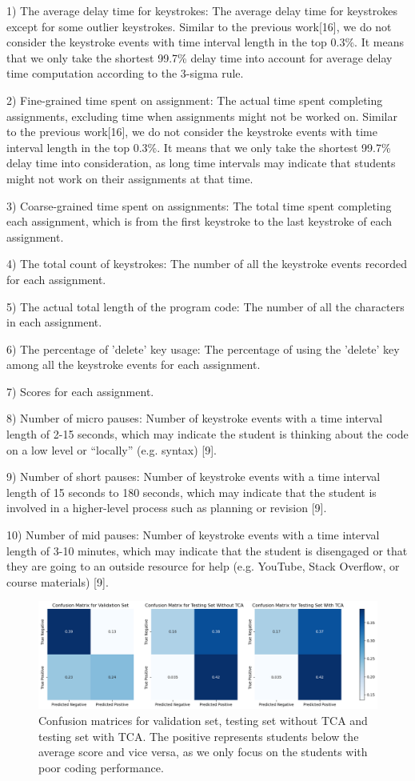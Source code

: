 \documentclass[sigconf,final]{acmart}
\begin{document}
1) The average delay time for keystrokes: The average delay time for keystrokes except for some outlier keystrokes. Similar to the previous work[16], we do not consider the keystroke events with time interval length in the top 0.3\%. It means that we only take the shortest 99.7\% delay time into account for average delay time computation according to the 3-sigma rule.


2) Fine-grained time spent on assignment: The actual time spent completing assignments, excluding time when assignments might not be worked on. Similar to the previous work[16], we do not consider the keystroke events with time interval length in the top 0.3\%. It means that we only take the shortest 99.7\% delay time into consideration, as long time intervals may indicate that students might not work on their assignments at that time.


3) Coarse-grained time spent on assignments: The total time spent completing each assignment, which is from the first keystroke to the last keystroke of each assignment.


4) The total count of keystrokes: The number of all the keystroke events recorded for each assignment. 


5) The actual total length of the program code: The number of all the characters in each assignment. 


6) The percentage of 'delete' key usage: The percentage of using the 'delete' key among all the keystroke events for each assignment. 


7) Scores for each assignment.


8) Number of micro pauses: Number of keystroke events with a time interval length of 2-15 seconds, which may indicate the student is thinking about the code on a low level or “locally” (e.g. syntax) [9].


9) Number of short pauses: Number of keystroke events with a time interval length of 15 seconds to 180 seconds, which may indicate that the student is involved in a higher-level process such as planning or revision [9].


10) Number of mid pauses: Number of keystroke events with a time interval length of 3-10 minutes, which may indicate that the student is disengaged or that they are going to an outside resource for help (e.g. YouTube, Stack Overflow, or course materials) [9].


\begin{figure}[ht]
  \centering
  \includegraphics[width=\linewidth]{table4.png}
  \caption{Confusion matrices for validation set, testing set without TCA and testing set with TCA. The positive represents students below the average score and vice versa, as we only focus on the students with poor coding performance.}
  \label{fig:imglabel}
\end{figure}
\end{document}
